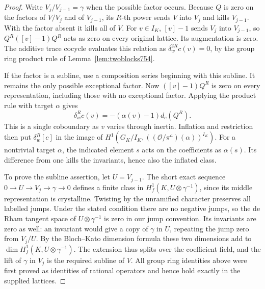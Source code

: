 \documentclass[a4paper,11pt]{article}
\theoremstyle{definition}
\theoremstyle{remark}
\numberwithin{equation}{section}
\begin{document}
\begin{proof}
Write \(V_j/V_{j-1}=\gamma\) when the possible factor occurs.
Because \(Q\) is zero on the factors of \(V/V_j\) and of
\(V_{j-1}\), its \(R\)-th power sends \(V\) into \(V_j\) and
kills \(V_{j-1}\). With the factor absent it kills all of \(V\).
For \(v\in I_K\), \([v]-1\) sends \(V_j\) into \(V_{j-1}\),
so \(Q^R([v]-1)Q^R\) acts as zero on every original lattice.
Its augmentation is zero. The additive trace cocycle evaluates
this relation as \(\delta_w^{2R}c(v)=0\), by the group ring
product rule of Lemma~\ref{lem:twoblocks754}.

If the factor is a subline, use a composition series beginning
with this subline. It remains the only possible exceptional
factor. Now \(([v]-1)Q^R\) is zero on every representation,
including those with no exceptional factor. Applying the
product rule with target \(\alpha\) gives
\[
          \delta_w^R c(v)=-(\alpha(v)-1)d_c(Q^R).
\]
This is a single coboundary as \(v\) varies through inertia.
Inflation and restriction then put \(\delta_w^R[c]\) in the
image of \(H^1(G_K/I_K,((\mathcal O/\pi^a)(\alpha))^{I_K})\).
For a nontrivial target \(\alpha\), the indicated element \(s\)
acts on the coefficients as \(\alpha(s)\). Its difference from
one kills the invariants, hence also the inflated class.

To prove the subline assertion, let \(U=V_{j-1}\). The short
exact sequence \(0\to U\to V_j\to\gamma\to0\) defines a
finite class in \(H^1_f(K,U\otimes\gamma^{-1})\), since its
middle representation is crystalline. Twisting by the
unramified character preserves all labelled jumps. Under the
stated condition there are no negative jumps, so the de Rham
tangent space of \(U\otimes\gamma^{-1}\) is zero in our jump
convention. Its invariants are zero as well: an invariant would
give a copy of \(\gamma\) in \(U\), repeating the jump zero
from \(V_j/U\). By the Bloch--Kato dimension formula these
two dimensions add to \(\dim H_f^1(K,U\otimes\gamma^{-1})\).
The extension thus splits over the coefficient field, and the
lift of \(\gamma\) in \(V_j\) is the required subline of \(V\).
All group ring identities above were first proved as identities
of rational operators and hence hold exactly in the supplied
lattices.
\end{proof}
\end{document}
